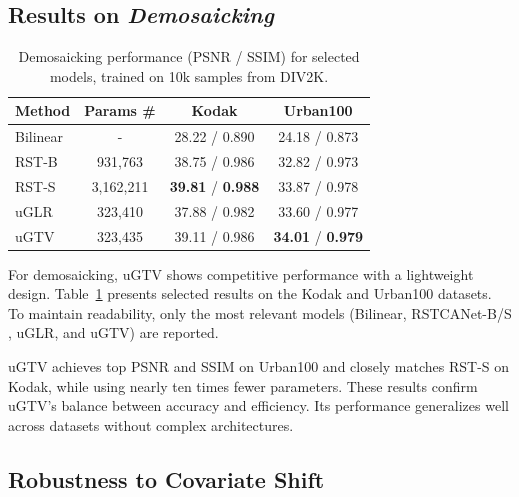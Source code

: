 \documentclass{article}
\theoremstyle{plain}
\theoremstyle{definition}
\theoremstyle{remark}
\begin{document}
\subsection{Results on \textit{Demosaicking}}

\begin{table}[b]
\vskip -0.3in
\caption{Demosaicking performance (PSNR / SSIM) for selected models, trained on 10k samples from DIV2K.}
\label{tab:demosaicking_selected}
\begin{center}
\begin{small}
\begin{sc}
\begin{tabular}{lccc}
\toprule
\textbf{Method} & \textbf{Params \#} & \textbf{Kodak} & \textbf{Urban100} \\
\midrule
Bilinear  & -        &  28.22 / 0.890 & 24.18 / 0.873 \\
RST-B & 931,763   &  38.75 / 0.986 & 32.82 / 0.973 \\
RST-S & 3,162,211 &  \textbf{39.81} / \textbf{0.988} & 33.87 / 0.978 \\
uGLR  & 323,410   &  37.88 / 0.982 & 33.60 / 0.977 \\
uGTV  & 323,435   &  39.11 / 0.986 & \textbf{34.01} / \textbf{0.979} \\
\bottomrule
\end{tabular}
\end{sc}
\end{small}
\end{center}
\vskip -0.2in
\end{table}

For demosaicking, uGTV shows competitive performance with a lightweight design. Table~\ref{tab:demosaicking_selected} presents selected results on the Kodak and Urban100 datasets. To maintain readability, only the most relevant models (Bilinear, RSTCANet-B/S \cite{xing2022residual}, uGLR, and uGTV) are reported.

uGTV achieves top PSNR and SSIM on Urban100 and closely matches RST-S on Kodak, while using nearly ten times fewer parameters. These results confirm uGTV’s balance between accuracy and efficiency. Its performance generalizes well across datasets without complex architectures.

\subsection{Robustness to Covariate Shift}
\end{document}
